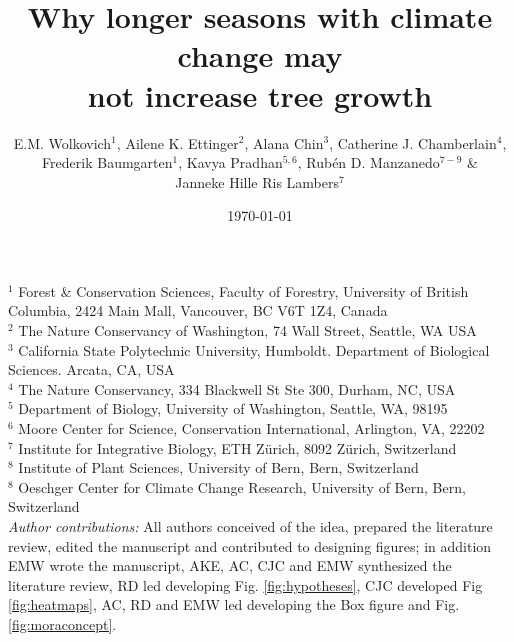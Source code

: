 \documentclass[11pt]{article}
\begin{document}
\renewcommand{\refname}{\CHead{}}


\title{Why longer seasons with climate change may \\ not increase tree growth} 
\author{E.M. Wolkovich$^1$, Ailene K. Ettinger$^2$, Alana Chin$^3$, Catherine J. Chamberlain$^4$,\\ Frederik Baumgarten$^1$, Kavya Pradhan$^{5,6}$, Rub{\'e}n D. Manzanedo$^{7-9}$ \& \\ Janneke Hille Ris Lambers$^7$}
\date{\today}
\maketitle

$^1$ Forest \& Conservation Sciences, Faculty of Forestry, University of British Columbia, 2424 Main Mall, Vancouver, BC V6T 1Z4, Canada\\
$^2$ The Nature Conservancy of Washington, 74 Wall Street, Seattle, WA  USA \\
$^3$ California State Polytechnic University, Humboldt. Department of Biological Sciences. Arcata, CA, USA \\
$^4$ The Nature Conservancy, 334 Blackwell St Ste 300, Durham, NC, USA \\ 
$^5$ Department of Biology, University of Washington, Seattle, WA, 98195 \\
$^6$ Moore Center for Science, Conservation International, Arlington, VA, 22202 \\ %
$^7$ Institute for Integrative Biology, ETH Z{\"u}rich, 8092 Z{\"u}rich, Switzerland \\ %
$^8$ Institute of Plant Sciences, University of Bern, Bern, Switzerland \\
$^8$ Oeschger Center for Climate Change Research, University of Bern, Bern, Switzerland \\

\emph{Author contributions:}  All authors conceived of the idea, prepared the literature review, edited the manuscript and contributed to designing figures; in addition EMW wrote the manuscript, AKE, AC, CJC  and EMW synthesized the literature review, RD led developing Fig. \ref{fig:hypotheses}, CJC developed Fig \ref{fig:heatmaps}, AC, RD and EMW led developing the Box figure and Fig. \ref{fig:moraconcept}. 
\end{document}
